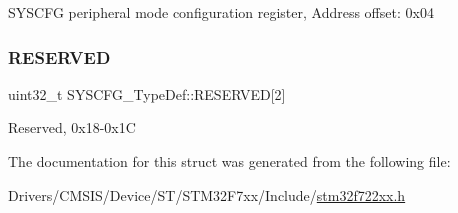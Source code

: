 S\+Y\+S\+C\+FG peripheral mode configuration register, Address offset\+: 0x04 \mbox{\label{struct_s_y_s_c_f_g___type_def_a43926e6d31a976a0018b2d1f5c92645d}} 
\subsubsection{\texorpdfstring{RESERVED}{RESERVED}}
{\footnotesize\ttfamily uint32\+\_\+t S\+Y\+S\+C\+F\+G\+\_\+\+Type\+Def\+::\+R\+E\+S\+E\+R\+V\+ED\mbox{[}2\mbox{]}}

Reserved, 0x18-\/0x1C 

The documentation for this struct was generated from the following file\+:\begin{DoxyCompactItemize}
\item 
Drivers/\+C\+M\+S\+I\+S/\+Device/\+S\+T/\+S\+T\+M32\+F7xx/\+Include/\mbox{\hyperlink{stm32f722xx_8h}{stm32f722xx.\+h}}\end{DoxyCompactItemize}
